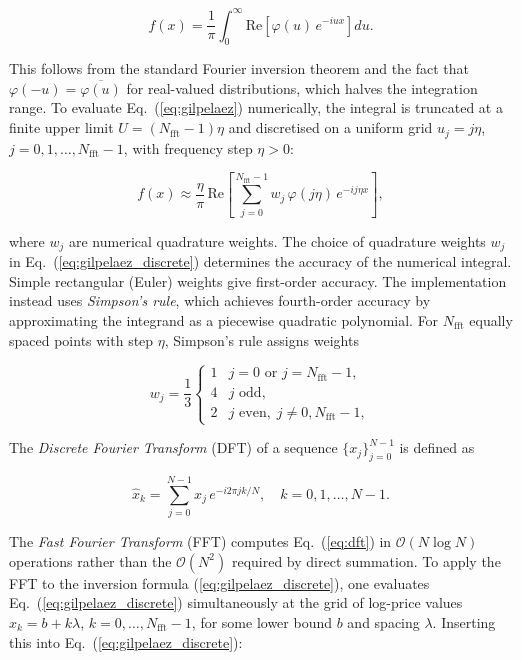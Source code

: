 \begin{equation}
    f(x) = \frac{1}{\pi}\int_0^\infty \text{Re}\!\left[\varphi(u)\,e^{-iux}\right]du.
    \label{eq:gilpelaez}
\end{equation}

This follows from the standard Fourier inversion theorem and the fact that $\varphi(-u) = \overline{\varphi(u)}$ for real-valued distributions, which halves the integration range. To evaluate Eq.~(\ref{eq:gilpelaez}) numerically, the integral is truncated at a finite upper limit $U = (N_\text{fft}-1)\eta$ and discretised on a uniform grid $u_j = j\eta$, $j = 0, 1, \ldots, N_\text{fft}-1$, with frequency step $\eta > 0$:

\begin{equation}
    f(x) \approx \frac{\eta}{\pi}\,\text{Re}\!\left[\sum_{j=0}^{N_\text{fft}-1} w_j\,\varphi(j\eta)\,e^{-ij\eta x}\right],
    \label{eq:gilpelaez_discrete}
\end{equation}

where $w_j$ are numerical quadrature weights.
The choice of quadrature weights $w_j$ in Eq.~(\ref{eq:gilpelaez_discrete}) determines the accuracy of the numerical integral. Simple rectangular (Euler) weights give first-order accuracy. The implementation instead uses \textit{Simpson's rule}, which achieves fourth-order accuracy by approximating the integrand as a piecewise quadratic polynomial. For $N_\text{fft}$ equally spaced points with step $\eta$, Simpson's rule assigns weights

\begin{equation}
    w_j = \frac{1}{3}\begin{cases} 1 & j = 0 \text{ or } j = N_\text{fft}-1, \\ 4 & j \text{ odd}, \\ 2 & j \text{ even}, \; j \neq 0, N_\text{fft}-1, \end{cases}
    \label{eq:simpson}
\end{equation}

The \textit{Discrete Fourier Transform} (DFT) of a sequence $\{x_j\}_{j=0}^{N-1}$ is defined as

\begin{equation}
    \hat{x}_k = \sum_{j=0}^{N-1} x_j\, e^{-i2\pi jk/N}, \quad k = 0, 1, \ldots, N-1.
    \label{eq:dft}
\end{equation}

The \textit{Fast Fourier Transform} (FFT) computes Eq.~(\ref{eq:dft}) in $\mathcal{O}(N\log N)$ operations rather than the $\mathcal{O}(N^2)$ required by direct summation. To apply the FFT to the inversion formula (\ref{eq:gilpelaez_discrete}), one evaluates Eq.~(\ref{eq:gilpelaez_discrete}) simultaneously at the grid of log-price values $x_k = b + k\lambda$, $k = 0, \ldots, N_\text{fft}-1$, for some lower bound $b$ and spacing $\lambda$. Inserting this into Eq.~(\ref{eq:gilpelaez_discrete}):

